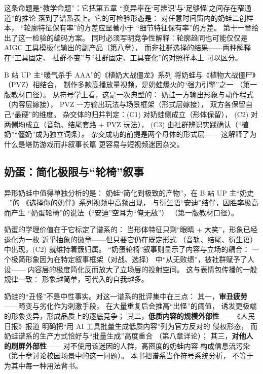 这条命题是“教学命题”：它把第五章
“变异率在‘可辨识’与‘足够怪’之间存在窄通道”的推论
落到了谱系表上。它的可检验形态是：
对任意时间窗内的奶蛙二创样本，
“轮廓特征保有率”的方差应显著小于
“细节特征保有率”的方差。
第十一章给出了这一检验的编码方案。
同时必须写明竞争性解释：轮廓趋同也可能仅仅是
AIGC 工具模板化输出的副产品（第八章），
而非社群选择的结果——两种解释在“工具固定、
社群不变”与“社群固定、工具变化”的对照样本上
可以区分。

\begin{nlcase}
  B 站 UP 主“暖气杀手 AAA”的《植奶大战僵龙》系列
  将奶蛙与《植物大战僵尸》（PVZ）相结合，
  制作多款高播放量视频，是奶蛙爆火的“强力引擎”之一
  （第一版教材口径）。
  从符号学上看，这是一次典型的：
  奶蛙一方输出形象与动作程式（内容层嫁接），
  PVZ 一方输出玩法与场景框架（形式层嫁接），
  双方各保留自己“最硬”的维度。
  杂交体的归并判定：(C1) 对奶蛙侧成立（形体保留），
  (C2) 对两侧均成立（音轨、结尾套路 + PVZ 玩法），
  (C3) 由社群辨识实践确认（“植奶”“僵奶”成为独立词条）。
  杂交成功的前提是两个母体的形式层——
  这解释了为什么是塔防游戏而非叙事长篇
  更容易与短视频迷因杂交。
\end{nlcase}

\subsection{奶蛋：简化极限与“轮椅”叙事}

异形奶蛙中值得单独分析的是：
奶蛙“简化到极致的产物”，在 B 站 UP 主“奶史\_”的
《选择你的奶伴》系列视频中高频出现，
与衍生语“安迪”结伴，因胜率极高而产生
“奶蛋轮椅”的说法（“安迪”空耳为“俺无敌”）
（第一版教材口径）。

奶蛋的学理价值在于它标定了谱系的：
当形体特征只剩“眼睛 + 大笑”，形象已经退化为一枚
近乎抽象的徽章——但只要它仍在既定形式
（音轨、结尾、衍生语）中出现，(C2) 就维持着簇归属。
“奶蛋轮椅”叙事则显示了内容与立场的耦合：
一个极简形象因为在特定叙事框架（对战、选择）
中“从无败绩”，被社群赋予了人设——
内容层的极度简化反而放大了立场层的投射空间。
这与表情包传播的一般规律一致：
形象越简单，可代入的自我越多。

\begin{nlcritique}
  奶蛙的“丑怪”不是中性事实。对这一谱系的批评集中在三点：
  其一，\textbf{审丑疲劳}——畸变与劣化作为刺激手段，
  在大量重复后会推高“出怪”的阈值，
  诱发更极端的形象变异，形成品质上的逐底竞争；
  其二，\textbf{低质内容的规模外部性}——《人民日报》报道
  明确把“用 AI 工具批量生成低质内容”列为官方反对的
  侵权形态\cite{jiang2026nailong}，
  而奶蛙谱系的生产方式恰好与“批量生成”高度重合
  （第八章详论）；
  其三，\textbf{对他人的刷屏外部性}——
  对不使用该迷因的人群，高密度的奶蛙内容
  构成信息流污染（第十章讨论校园场景中的这一问题）。
  本书把谱系当作符号系统分析，
  不等于为其中每一种用法背书。
\end{nlcritique}

